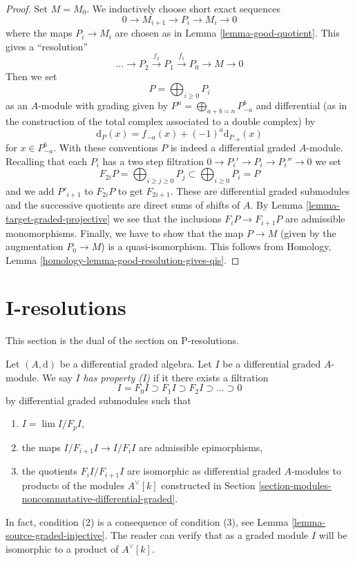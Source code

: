 \documentclass{stacks-project}
\theoremstyle{plain}
\theoremstyle{definition}
\theoremstyle{remark}
\numberwithin{equation}{subsection}
\def\lim{\mathop{\mathrm{lim}}\nolimits}
\begin{document}
\begin{proof}
Set $M = M_0$. We inductively choose short exact sequences
$$
0 \to M_{i + 1} \to P_i \to M_i \to 0
$$
where the maps $P_i \to M_i$ are chosen as in Lemma \ref{lemma-good-quotient}.
This gives a ``resolution''
$$
\ldots \to P_2 \xrightarrow{f_2} P_1 \xrightarrow{f_1} P_0 \to M \to 0
$$
Then we set
$$
P = \bigoplus\nolimits_{i \geq 0} P_i
$$
as an $A$-module with grading given by
$P^n = \bigoplus_{a + b = n} P_{-a}^b$ and
differential (as in the construction of the total complex associated
to a double complex) by
$$
\text{d}_P(x) = f_{-a}(x) + (-1)^a \text{d}_{P_{-a}}(x)
$$
for $x \in P_{-a}^b$. With these conventions $P$ is indeed a differential
graded $A$-module. Recalling that each $P_i$ has a two step filtration
$0 \to P_i' \to P_i \to P_i'' \to 0$ we set
$$
F_{2i}P = \bigoplus\nolimits_{i \geq j \geq 0} P_j
\subset
\bigoplus\nolimits_{i \geq 0} P_i = P
$$
and we add $P'_{i + 1}$ to $F_{2i}P$ to get $F_{2i + 1}$.
These are differential graded submodules and the successive quotients
are direct sums of shifts of $A$. By
Lemma \ref{lemma-target-graded-projective} we see that
the inclusions $F_iP \to F_{i + 1}P$ are admissible monomorphisms.
Finally, we have to show that the map $P \to M$ (given by the
augmentation $P_0 \to M$) is a quasi-isomorphism. This follows from
Homology, Lemma \ref{homology-lemma-good-resolution-gives-qis}.
\end{proof}





\section{I-resolutions}
\label{section-I-resolutions}

\noindent
This section is the dual of the section on P-resolutions.

\medskip\noindent
Let $(A, \text{d})$ be a differential graded algebra.
Let $I$ be a differential graded $A$-module. We say $I$
{\it has property (I)} if it there exists a filtration
$$
I = F_0I \supset F_1I \supset F_2I \supset \ldots \supset 0
$$
by differential graded submodules such that
\begin{enumerate}
\item $I = \lim I/F_pI$,
\item the maps $I/F_{i + 1}I \to I/F_iI$ are admissible epimorphisms,
\item the quotients $F_iI/F_{i + 1}I$ are isomorphic as differential
graded $A$-modules to products of the modules $A^\vee[k]$ constructed
in Section \ref{section-modules-noncommutative-differential-graded}.
\end{enumerate}
In fact, condition (2) is a consequence of condition (3), see
Lemma \ref{lemma-source-graded-injective}. The reader can verify that as
a graded module $I$ will be isomorphic to a product of $A^\vee[k]$.
\end{document}
